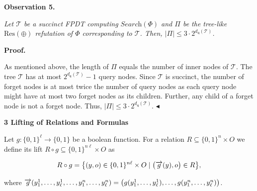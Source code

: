 

\par\medskip\noindent\textbf{
\textbf{Observation 5}\textbf{.}
}\par



\emph{Let $\mathcal{T}$ be a succinct FPDT computing $\textit{Search}(\Phi)$ and $\Pi$ be the tree-like $\text{Res}(\oplus)$ refutation of $\Phi$ corresponding to $\mathcal{T}$. Then, $|\Pi|\leq 3\cdot 2^{d_{\mathsf{q}}(\mathcal{T})}$.}\par







\par\medskip\noindent\textbf{Proof.}\par




As mentioned above, the length of $\Pi$ equals the number of inner nodes of $\mathcal{T}$.
The tree $\mathcal{T}$ has at most $2^{d_{\mathsf{q}}(\mathcal{T})}-1$ query nodes.
Since $\mathcal{T}$ is succinct, the number of forget nodes is at most twice the number of query nodes as each query node might have at most two forget nodes as its children. Further, any child of a forget node is not a forget node.
Thus, $|\Pi|\leq 3\cdot 2^{d_{\mathsf{q}}(\mathcal{T})}$.
$\blacktriangleleft$\par






\par\medskip\noindent\textbf{
3 Lifting of Relations and Formulas}\par




Let $g:\{0,1\}^{\ell}\to\{0,1\}$ be a boolean function.
For a relation $R\subseteq\{0,1\}^{n}\times O$ we define its lift $R\circ g\subseteq\{0,1\}^{n\ell}\times O$ as\par


\[\begin{gathered}
R\circ g=\bigl{\{}(y,o)\in\{0,1\}^{n\ell}\times O\mid\bigl{(}\overrightarrow{g%
}(y),o\bigr{)}\in R\bigr{\}},
\end{gathered}\]


where $\overrightarrow{g}(y^{1}_{1},\dots,y^{1}_{\ell},\dots,y^{n}_{1},\dots,y^{n}_{%
\ell})=\bigl{(}g(y^{1}_{1},\dots,y^{1}_{\ell}),\dots,g(y^{n}_{1},\dots,y^{n}_{%
\ell})\bigr{)}$.\par





